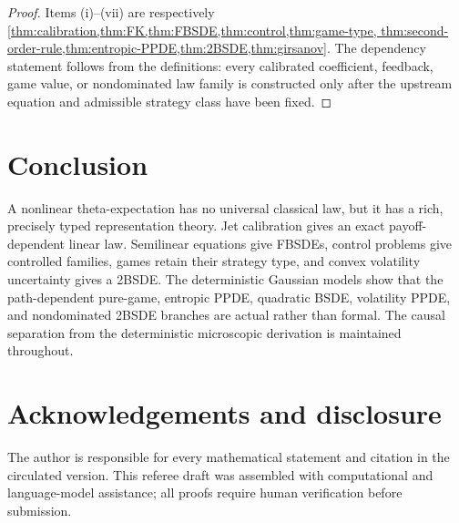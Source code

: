 \documentclass[11pt,reqno]{amsart}
\theoremstyle{definition}
\theoremstyle{remark}
\begin{document}
\begin{proof}
Items (i)--(vii) are respectively
\cref{thm:calibration,thm:FK,thm:FBSDE,thm:control,thm:game-type,
thm:second-order-rule,thm:entropic-PPDE,thm:2BSDE,thm:girsanov}.  The dependency
statement follows from the definitions: every calibrated coefficient,
feedback, game value, or nondominated law family is constructed only after the
upstream equation and admissible strategy class have been fixed.
\end{proof}

\section{Conclusion}

A nonlinear theta-expectation has no universal classical law, but it has a
rich, precisely typed representation theory.  Jet calibration gives an exact
payoff-dependent linear law.  Semilinear equations give FBSDEs, control
problems give controlled families, games retain their strategy type, and
convex volatility uncertainty gives a 2BSDE.  The deterministic Gaussian
models show that the path-dependent pure-game, entropic PPDE, quadratic BSDE,
volatility PPDE, and nondominated 2BSDE branches are actual rather than formal.
The causal separation from the deterministic microscopic derivation is
maintained throughout.

\section*{Acknowledgements and disclosure}
The author is responsible for every mathematical statement and citation in the
circulated version.  This referee draft was assembled with computational and
language-model assistance; all proofs require human verification before
submission.



\end{document}
